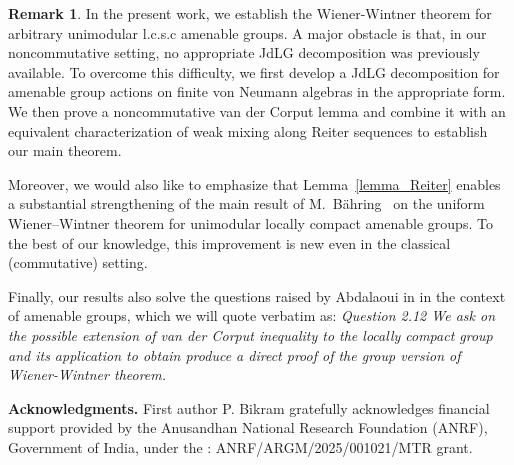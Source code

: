 \documentclass[11pt]{amsart}
\theoremstyle{definition}
\theoremstyle{myremark}
\newtheorem{rem}[thm]{Remark}
\numberwithin{equation}{section}
\begin{document}
\begin{rem}
\medskip
In the present work, we establish the Wiener-Wintner theorem for arbitrary unimodular l.c.s.c amenable groups. A major obstacle is that, in our noncommutative setting, no appropriate JdLG decomposition was previously available. To overcome this difficulty, we first develop a JdLG decomposition for amenable group actions on finite von Neumann algebras in the appropriate form. We then prove a noncommutative van der Corput lemma and combine it with an equivalent characterization of weak mixing along Reiter sequences to establish our main theorem.

Moreover,  we would also like to emphasize that Lemma~\ref{lemma_Reiter} enables a substantial strengthening of the main result of M.~B\"ahring~\cite{Bahring2019} on the uniform Wiener--Wintner theorem for unimodular locally compact amenable groups. To the best of our knowledge, this improvement is new even in the classical (commutative) setting.

\medskip
Finally, our results also solve the questions raised by Abdalaoui in  \cite[Question 2.12]{ElAbdalaoui2021} in the context of amenable groups, 
which we will quote verbatim as:
\emph{
Question 2.12  We ask on the possible extension of van der Corput inequality to the locally compact group and its application to obtain produce a direct
proof of the group version of Wiener-Wintner theorem.}



\end{rem}



\noindent\textbf{Acknowledgments.} 
First author P. Bikram gratefully acknowledges financial support provided by the Anusandhan National Research Foundation (ANRF), Government of India, under the : ANRF/ARGM/2025/001021/MTR  grant.

\providecommand{\bysame}{\leavevmode\hbox to3em{\hrulefill}\thinspace}
\providecommand{\MR}{\relax\ifhmode\unskip\space\fi MR }
\providecommand{\MRhref}[2]{%
\href{http://www.ams.org/mathscinet-getitem?mr=#1}{#2} }
\providecommand{\href}[2]{#2}
\end{document}
